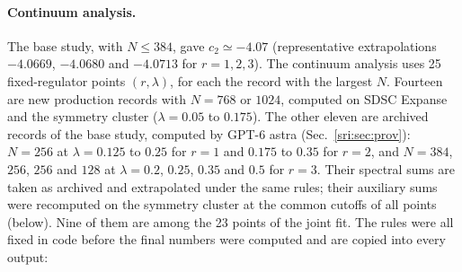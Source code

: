 \paragraph{Continuum analysis.} The base study, with $N\le384$, gave $c_2\simeq-4.07$ (representative extrapolations
$-4.0669$, $-4.0680$ and $-4.0713$ for $r=1,2,3$). The continuum analysis uses 25 fixed-regulator points $(r,\lambda)$,
for each the record with the largest $N$. Fourteen are new production records with $N=768$ or $1024$, computed on SDSC
Expanse and the symmetry cluster ($\lambda=0.05$ to $0.175$). The other eleven are archived records of the base study,
computed by GPT-6 astra (Sec.~\ref{sri:sec:prov}): $N=256$ at $\lambda=0.125$ to $0.25$ for $r=1$ and $0.175$ to $0.35$ for
$r=2$, and $N=384$, $256$, $256$ and $128$ at $\lambda=0.2$, $0.25$, $0.35$ and $0.5$ for $r=3$. Their spectral sums are
taken as archived and extrapolated under the same rules; their auxiliary sums were recomputed on the symmetry cluster at the common cutoffs of all points
(below). Nine of them are among the 23 points of the joint fit. The rules were all fixed in code before the final
numbers were computed and are copied into every output:
